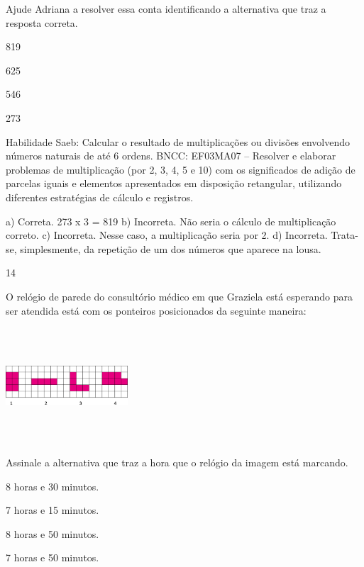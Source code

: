 \begin{multicols}{2}
\begin{enumerate}
{Ajude Adriana a resolver essa conta identificando a alternativa que traz a resposta correta.

\begin{escolha}
\item
  819
\item
  625
\item
  546
\item
  273
\end{escolha}

Habilidade Saeb: Calcular o resultado de multiplicações ou divisões
envolvendo números naturais de até 6 ordens.
BNCC: EF03MA07 – Resolver e elaborar problemas de multiplicação (por 2, 3, 4, 5 e 10) com os
significados de adição de parcelas iguais e elementos apresentados em disposição retangular,
utilizando diferentes estratégias de cálculo e registros.


a) Correta. 273 x 3 = 819
b) Incorreta. Não seria o cálculo de multiplicação correto.
c) Incorreta. Nesse caso, a multiplicação seria por 2.
d) Incorreta. Trata-se, simplesmente, da repetição de um dos números que aparece na lousa.

\num{14}

O relógio de parede do consultório médico em que Graziela está esperando
para ser atendida está com os ponteiros posicionados da seguinte maneira:


\includegraphics[width=1.79182in,height=1.69181in]{media/image115.png}

Assinale a alternativa que traz a hora que o relógio da imagem está marcando.

\begin{escolha}
\item
  8 horas e 30 minutos.
\item
  7 horas e 15 minutos.
\item
  8 horas e 50 minutos.
\item
  7 horas e 50 minutos.
\end{escolha}

}
\end{enumerate}
\end{multicols}
